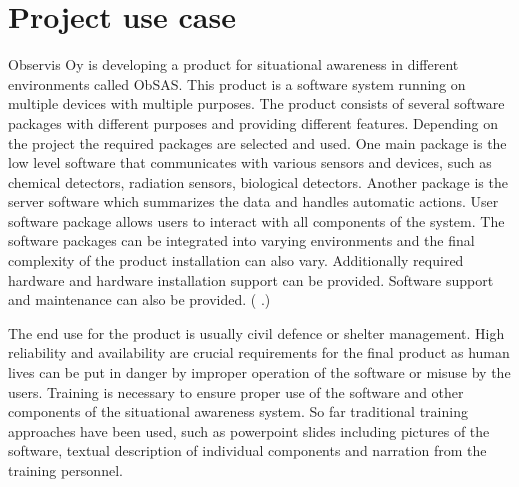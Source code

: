 \documentclass[12pt, a4paper,oneside, nocenter]{thesis}
\newcommand{\citeyeartitlexamk}[1]{(\usebibentry{#1}{title} \citeyear{#1}.)}
\begin{document}
\chapter{\texorpdfstring{Project use case}{proj-use-case}}
Observis Oy is developing a product for situational awareness in different environments called ObSAS. This product is a software system running on multiple devices with multiple purposes. The product consists of several software packages with different purposes and providing different features. Depending on the project the required packages are selected and used. One main package is the low level software that communicates with various sensors and devices, such as chemical detectors, radiation sensors, biological detectors. Another package is the server software which summarizes the data and handles automatic actions. User software package allows users to interact
with all components of the system. The software packages can be integrated into varying environments and the final complexity of the product installation can also vary. Additionally required hardware and hardware installation support can be provided. Software support and maintenance can also be provided. \citeyeartitlexamk{obsas-docs}
\par
The end use for the product is usually civil defence or shelter management. High reliability and availability are crucial requirements for the final product as human lives can be put in danger by improper operation of the software or misuse by the users. Training is necessary to ensure proper use of the software and 
other components of the situational awareness system. So far traditional training approaches have been used, such as powerpoint slides including pictures of the software, textual description of individual components and narration from the training personnel.
\par
\end{document}
